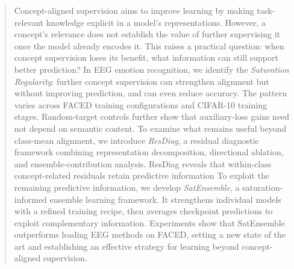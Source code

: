 \begin{abstract}
Concept-aligned supervision aims to improve learning by making task-relevant knowledge explicit in a model's representations. However, a concept's relevance does not establish the value of further supervising it once the model already encodes it. This raises a practical question: when concept supervision loses its benefit, what information can still support better prediction? In EEG emotion recognition, we identify the \emph{Saturation Regularity}: further concept supervision can strengthen alignment but without improving prediction, and can even reduce accuracy. The pattern varies across FACED training configurations and CIFAR-10 training stages. Random-target controls further show that auxiliary-loss gains need not depend on semantic content. To examine what remains useful beyond class-mean alignment, we introduce \emph{ResDiag}, a residual diagnostic framework combining representation decomposition, directional ablation, and ensemble-contribution analysis. ResDiag reveals that within-class concept-related residuals retain predictive information  To exploit the remaining predictive information, we develop \emph{SatEnsemble}, a saturation-informed ensemble learning framework. It strengthens individual models with a refined training recipe, then averages checkpoint predictions to exploit complementary information. Experiments show that SatEnsemble outperforms leading EEG methods on FACED, setting a new state of the art and establishing an effective strategy for learning beyond concept-aligned supervision.

\end{abstract}

